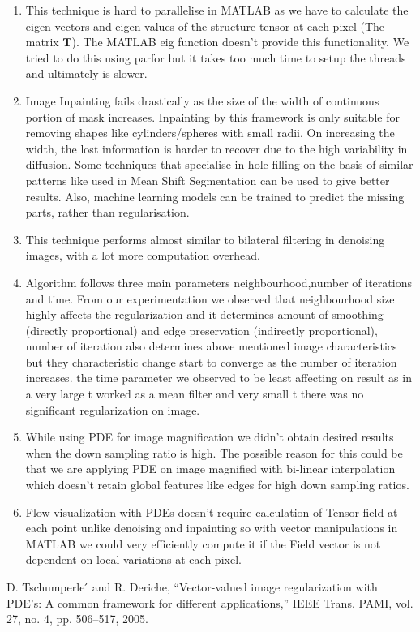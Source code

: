 \documentclass[a4paper]{article}
\begin{document}
\begin{enumerate}
    \item This technique is hard to parallelise in MATLAB as we have to calculate the eigen vectors and eigen values of the  structure tensor at each pixel (The matrix $\textbf{T}$). The MATLAB eig function doesn't provide this functionality. We tried to do this using parfor but it takes too much time to setup the threads and ultimately is slower.
    
    \item Image Inpainting fails drastically as the size of the width of continuous portion of mask increases. Inpainting by this framework is only suitable for removing shapes like cylinders/spheres with small radii. On increasing the width, the lost information is harder to recover due to the high variability in diffusion. Some techniques that specialise in hole filling on the basis of similar patterns like used in Mean Shift Segmentation can be used to give better results. Also, machine learning models can be trained to predict the missing parts, rather than regularisation.
    
    \item This technique performs almost similar to bilateral filtering in denoising images, with a lot more computation overhead.
    
    \item Algorithm follows three main parameters neighbourhood,number of iterations and time. From our experimentation we observed that neighbourhood size highly affects the regularization and it determines amount of smoothing (directly proportional) and edge preservation (indirectly proportional), number of iteration also determines above mentioned image characteristics but they characteristic change start to converge as the number of iteration increases. the time parameter we observed to be least affecting on result as in a very large t worked as a mean filter and very small t there was no significant regularization on image. 
    
    \item While using PDE for image magnification we didn't obtain desired results when the down sampling ratio is high. The possible reason for this could be that we are applying PDE on image magnified with bi-linear interpolation which doesn't retain global features like edges for high down sampling ratios.
    
    \item Flow visualization with PDEs doesn't require calculation of Tensor field at each point unlike denoising and inpainting so with vector manipulations in MATLAB we could very efficiently compute it if the Field vector is not dependent on local variations at each pixel. 
    
\end{enumerate}

\begin{thebibliography}{9}
D. Tschumperle ́ and R. Deriche, “Vector-valued image regularization with PDE’s: A common framework for different applications,” IEEE Trans. PAMI, vol. 27, no. 4, pp. 506–517, 2005. 
\end{thebibliography}
\end{document}
